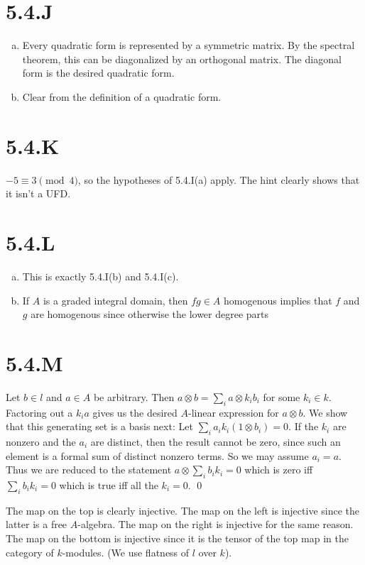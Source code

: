 \documentclass{article}
\begin{document}
\section{5.4.J}
\begin{enumerate}[a.]
    \item Every quadratic form is represented by a symmetric matrix. By the spectral
          theorem, this can be diagonalized by an orthogonal matrix. The diagonal form is
          the desired quadratic form.
    \item Clear from the definition of a quadratic form.
\end{enumerate}

\section{5.4.K}
$-5 \equiv 3 \pmod{4}$, so the hypotheses of 5.4.I(a) apply. The hint clearly
shows that it isn't a UFD.

\section{5.4.L}
\begin{enumerate}[a.]
    \item This is exactly 5.4.I(b) and 5.4.I(c).
    \item If $A$ is a graded integral domain, then
          $fg \in A$ homogenous implies that $f$ and
          $g$ are homogenous since otherwise the lower degree parts
\end{enumerate}

\section{5.4.M}
Let $b \in l$ and $a \in A$ be arbitrary. Then
$a \otimes b = \sum_i a \otimes k_ib_i$ for some $k_i \in k$. Factoring out a
$k_ia$ gives us the desired $A$-linear
expression for $a \otimes b$. We show that this generating set is a
basis next: Let $\sum_i a_ik_i(1 \otimes b_i)=0$. If the $k_i$ are
nonzero and the $a_i$ are distinct, then the result cannot be
zero, since such an element is a formal sum of distinct nonzero terms. So we
may assume $a_i=a$. Thus we are reduced to the statement
$a \otimes \sum_i b_ik_i=0$ which is zero iff $\sum_i b_ik_i=0$ which is true
iff all the $k_i=0$. \qed

The map on the top is clearly injective. The map on the left is injective since
the latter is a free $A$-algebra. The map on the right is
injective for the same reason. The map on the bottom is injective since it is
the tensor of the top map in the category of $k$-modules.
(We use flatness of $l$ over $k$).
\end{document}
